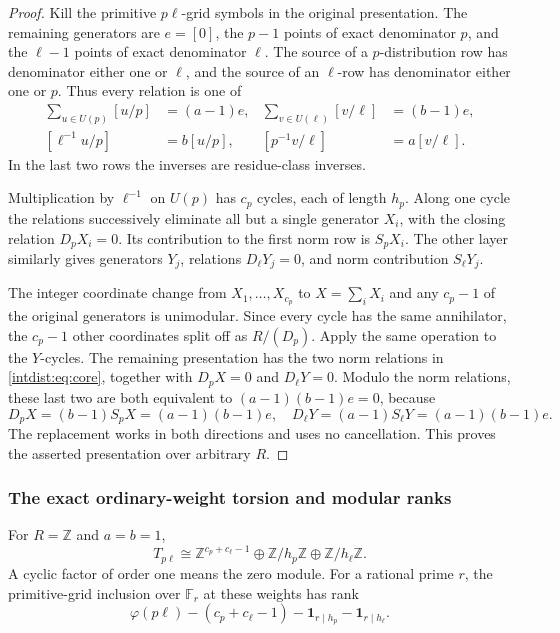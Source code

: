 \begin{proof}
Kill the primitive $p\ell$-grid symbols in the original presentation.
The remaining generators are $e=[0]$, the $p-1$ points of exact
denominator $p$, and the $\ell-1$ points of exact denominator $\ell$.
The source of a $p$-distribution row has denominator either one or
$\ell$, and the source of an $\ell$-row has denominator either one or
$p$. Thus every relation is one of
\begin{align*}
 \sum_{u\in U(p)}[u/p]&=(a-1)e,&
 \sum_{v\in U(\ell)}[v/\ell]&=(b-1)e,\\
 [\ell^{-1}u/p]&=b[u/p],&
 [p^{-1}v/\ell]&=a[v/\ell].
\end{align*}
In the last two rows the inverses are residue-class inverses.

Multiplication by $\ell^{-1}$ on $U(p)$ has $c_p$ cycles, each of
length $h_p$. Along one cycle the relations successively eliminate
all but a single generator $X_i$, with the closing relation
$D_pX_i=0$. Its contribution to the first norm row is $S_pX_i$.
The other layer similarly gives generators $Y_j$, relations
$D_\ell Y_j=0$, and norm contribution $S_\ell Y_j$.

The integer coordinate change from $X_1,\ldots,X_{c_p}$ to
$X=\sum_iX_i$ and any $c_p-1$ of the original generators is unimodular.
Since every cycle has the same annihilator, the $c_p-1$ other
coordinates split off as $R/(D_p)$. Apply the same operation to the
$Y$-cycles. The remaining presentation has the two norm relations in
\eqref{intdist:eq:core}, together with $D_pX=0$ and $D_\ell Y=0$.
Modulo the norm relations, these last two are both equivalent to
$(a-1)(b-1)e=0$, because
\[
 D_pX=(b-1)S_pX=(a-1)(b-1)e,
 \quad
 D_\ell Y=(a-1)S_\ell Y=(a-1)(b-1)e.
\]
The replacement works in both directions and uses no cancellation.
This proves the asserted presentation over arbitrary $R$.
\end{proof}

\subsubsection{The exact ordinary-weight torsion and modular ranks}

\begin{corollary}
\label{intdist:cor:ordinary}
For $R=\mathbb Z$ and $a=b=1$,
\begin{equation}\label{intdist:eq:ordinary}
 T_{p\ell}\cong
 \mathbb Z^{c_p+c_\ell-1}
 \oplus\mathbb Z/h_p\mathbb Z
 \oplus\mathbb Z/h_\ell\mathbb Z.
\end{equation}
A cyclic factor of order one means the zero module. For a rational
prime $r$, the primitive-grid inclusion over $\mathbb F_r$ at these
weights has rank
\begin{equation}\label{intdist:eq:modular-rank}
 \varphi(p\ell)-(c_p+c_\ell-1)
 -\mathbf1_{r\mid h_p}-\mathbf1_{r\mid h_\ell}.
\end{equation}
\end{corollary}

